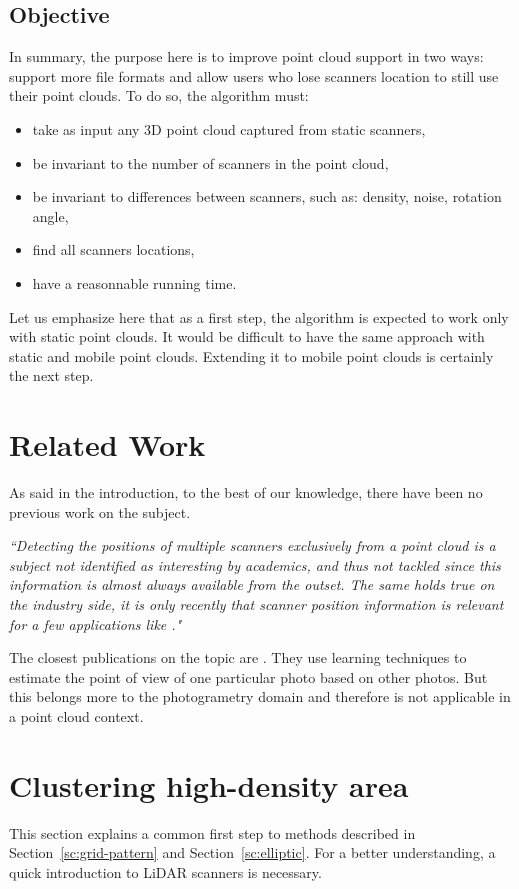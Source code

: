 \subsection{Objective}
In summary, the purpose here is to improve \CC point cloud support in two ways: support more file formats and allow users who lose scanners location to still use their point clouds. To do so, the algorithm must:
\begin{itemize}
  \item take as input any 3D point cloud captured from static scanners,
  \item be invariant to the number of scanners in the point cloud,
  \item be invariant to differences between scanners, such as: density, noise, rotation angle,
  \item find all scanners locations,
  \item have a reasonnable running time.
\end{itemize}

Let us emphasize here that as a first step, the algorithm is expected to work only with static point clouds. It would be difficult to have the same approach with static and mobile point clouds. Extending it to mobile point clouds is certainly the next step.



\section{Related Work}
\label{sc:work}
As said in the introduction, to the best of our knowledge, there have been no previous work on the subject.

\emph{``Detecting the positions of multiple scanners exclusively from a point cloud is a subject not identified as interesting by academics, and thus not tackled since this information is almost always available from the outset. The same holds true on the industry side, it is only recently that scanner position information is relevant for a few applications like \CC."}

The closest publications on the topic are \cite{ml1, ml2, ml3, ml4, ml5}. They use learning techniques to estimate the point of view of one particular photo based on other photos. But this belongs more to the photogrametry domain and therefore is not applicable in a point cloud context.



\section{Clustering high-density area}
\label{sc:highdens}
This section explains a common first step to methods described in Section~\ref{sc:grid-pattern} and Section~\ref{sc:elliptic}. For a better understanding, a quick introduction to LiDAR scanners is necessary.

